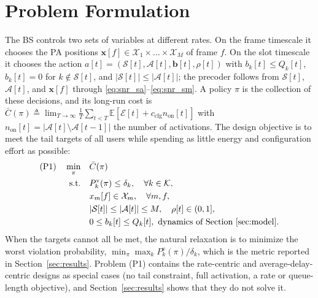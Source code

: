 \documentclass[journal]{IEEEtran}
\newcommand{\E}{\mathbb{E}}
\newcommand{\vect}[1]{\bm{#1}}
\newcommand{\Sset}{\mathcal{S}}
\newcommand{\Kset}{\mathcal{K}}
\begin{document}
\section{Problem Formulation}\label{sec:problem}
The BS controls two sets of variables at different rates. On the frame timescale it chooses the PA positions $\vect x[f]\in\mathcal X_1\times\dots\times\mathcal X_M$ of frame $f$. On the slot timescale it chooses the action $a[t]=(\Sset[t],\mathcal A[t],\vect b[t],\rho[t])$ with $b_k[t]\le Q_k[t]$, $b_k[t]=0$ for $k\notin\Sset[t]$, and $|\Sset[t]|\le|\mathcal A[t]|$; the precoder follows from $\Sset[t]$, $\mathcal A[t]$, and $\vect x[f]$ through \eqref{eq:snr_sa}--\eqref{eq:snr_sm}. A policy $\pi$ is the collection of these decisions, and its long-run cost is $\bar C(\pi)\triangleq\lim_{T\to\infty}\frac1T\sum_{t<T}\E[\mathcal E[t]+c_{\mathrm{cfg}}n_{\mathrm{on}}[t]]$ with $n_{\mathrm{on}}[t]=|\mathcal A[t]\setminus\mathcal A[t-1]|$ the number of activations. The design objective is to meet the tail targets of all users while spending as little energy and configuration effort as possible:
\begin{subequations}\label{eq:P1}
\begin{align}
\text{(P1)}\quad\min_{\pi}\quad & \bar C(\pi)\label{eq:P1obj}\\
\text{s.t.}\quad & P_k^{\mathrm v}(\pi)\le\delta_k,\quad\forall k\in\Kset,\label{eq:P1tail}\\
& x_m[f]\in\mathcal X_m,\quad\forall m,f,\label{eq:P1x}\\
& |\Sset[t]|\le|\mathcal A[t]|\le M,\quad\rho[t]\in(0,1],\label{eq:P1sched}\\
& 0\le b_k[t]\le Q_k[t],\ \text{dynamics of Section~\ref{sec:model}}.\label{eq:P1dyn}
\end{align}
\end{subequations}
When the targets cannot all be met, the natural relaxation is to minimize the worst violation probability, $\min_\pi\max_k P_k^{\mathrm v}(\pi)/\delta_k$, which is the metric reported in Section~\ref{sec:results}. Problem (P1) contains the rate-centric and average-delay-centric designs as special cases (no tail constraint, full activation, a rate or queue-length objective), and Section~\ref{sec:results} shows that they do not solve it.
\end{document}
